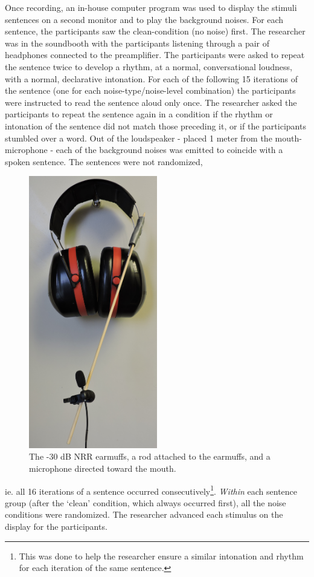 Once recording, an in-house computer program was used to display the stimuli sentences on a second monitor and to play the background noises.  For each sentence, the participants saw the clean-condition (no noise) first.  The researcher was in the soundbooth with the participants listening through a pair of headphones connected to the preamplifier.  
The participants were asked to repeat the sentence twice to develop a rhythm, at a normal, conversational loudness, with a normal, declarative intonation.  For each of the following 15 iterations of the sentence (one for each noise-type/noise-level combination) the participants were instructed to read the sentence aloud only once.  The researcher asked the participants to repeat the sentence again in a condition if the rhythm or intonation of the sentence did not match those preceding it, or if the participants stumbled over a word.  Out of the loudspeaker - placed 1 meter from the mouth-microphone - each of the background noises was emitted to coincide with a spoken sentence.  The sentences were not randomized, 
%
\begin{figure}
\includegraphics[width=0.5\textwidth]{figure/earmuffSetup.JPG}
\caption{The -30 dB NRR   earmuffs, a rod attached to the   earmuffs, and a microphone directed toward the mouth.}
\label{fig:earmuffSetup}
\end{figure}
%
ie. all 16 iterations of a sentence occurred consecutively\footnote{This was done to help the researcher ensure a similar intonation and rhythm for each iteration of the same sentence.}. \textit{Within} each sentence group (after the `clean' condition, which always occurred first), all the noise conditions were randomized. The researcher advanced each stimulus on the display for the participants.

